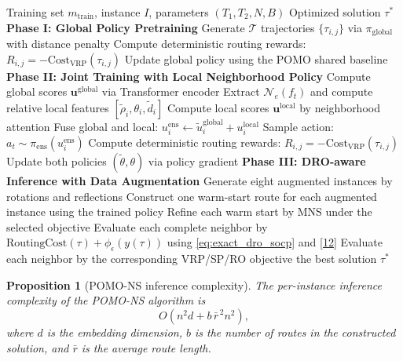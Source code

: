 \documentclass[preprint,12pt,authoryear]{elsarticle}
\newtheorem{proposition}{Proposition}
\theoremstyle{definition}
\begin{document}
\begin{algorithm}
\caption{POMO-NS Warm-start Training and DRO-aware Inference}
\label{alg:pomo_training}
\small
\begin{algorithmic}[1]
\Require Training set $m_{\text{train}}$, instance $I$, parameters $(T_1, T_2, N, B)$
\Ensure Optimized solution $\tau^*$
\State \textbf{Phase I: Global Policy Pretraining}
    \State Generate $\mathcal{T}$ trajectories $\{\tau_{i,j}\}$ via $\pi_{\text{global}}$ with distance penalty
    \State Compute deterministic routing rewards: $R_{i,j} = -\text{Cost}_{\mathrm{VRP}}(\tau_{i,j})$
    \State Update global policy using the POMO shared baseline
\EndFor
\State \textbf{Phase II: Joint Training with Local Neighborhood Policy}
        \State Compute global scores $\mathbf{u}^{\text{global}}$ via Transformer encoder
        \State Extract $\mathcal{N}_e(f_t)$ and compute relative local features $[\tilde{\rho}_i,\theta_i,\tilde{d}_i]$
        \State Compute local scores $\mathbf{u}^{\text{local}}$ by neighborhood attention
        \State Fuse global and local: $u_i^{\text{ens}} \leftarrow \tilde{u}_i^{\text{global}} + u_i^{\text{local}}$
        \State Sample action: $a_t \sim \pi_{\text{ens}}(u_i^{\text{ens}})$
    \EndFor
    \State Compute deterministic routing rewards: $R_{i,j} = -\text{Cost}_{\mathrm{VRP}}(\tau_{i,j})$
    \State Update both policies $(\tilde{\theta}, \theta)$ via policy gradient
\EndFor
\State \textbf{Phase III: DRO-aware Inference with Data Augmentation}
\State Generate eight augmented instances by rotations and reflections
\State Construct one warm-start route for each augmented instance using the trained policy
\State Refine each warm start by MNS under the selected objective
    \State Evaluate each complete neighbor by $\text{RoutingCost}(\tau)+\phi_{\epsilon}(y(\tau))$ using \eqref{eq:exact_dro_socp} and \eqref{12}
\Else
    \State Evaluate each neighbor by the corresponding VRP/SP/RO objective
\EndIf
\State \Return the best solution $\tau^*$
\end{algorithmic}
\end{algorithm}



\begin{proposition}[POMO-NS inference complexity]\label{prop3}
The per-instance inference complexity of the POMO-NS algorithm is
\[
O\!\left(n^{2} d + b\,\bar{r}^{\,2} n^{2}\right),
\]
where $d$ is the embedding dimension, $b$ is the number of routes in the constructed solution, and $\bar{r}$ is the average route length.
\end{proposition}
\end{document}
